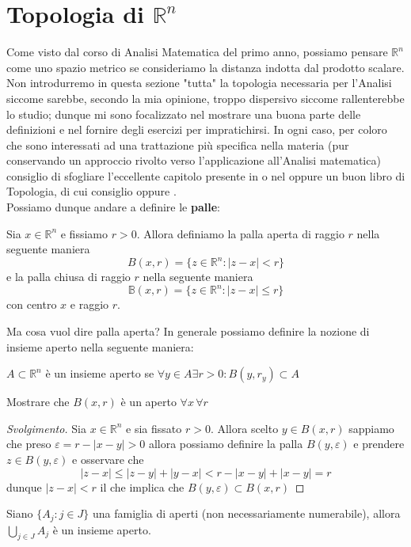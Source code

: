 \section{Topologia di $\mathbb{R}^n$}
Come visto dal corso di Analisi Matematica del primo anno, possiamo pensare $\mathbb{R}^n$ come uno spazio metrico se consideriamo la distanza indotta dal prodotto scalare. Non introdurremo in questa sezione "tutta" la topologia necessaria per l'Analisi siccome sarebbe, secondo la mia opinione, troppo dispersivo siccome rallenterebbe lo studio; dunque mi sono focalizzato nel mostrare una buona parte delle definizioni e nel fornire degli esercizi per impratichirsi. In ogni caso, per coloro che sono interessati
ad una trattazione più specifica nella materia (pur conservando un approccio rivolto verso l'applicazione all'Analisi matematica) consiglio di sfogliare l'eccellente capitolo presente in \cite{rudin} o nel \cite{ambrosio} oppure un buon libro di Topologia, di cui consiglio \cite{manetti} oppure \cite{munkres}. \\
Possiamo dunque andare a definire le \textbf{palle}:
\begin{definition}
Sia $x \in \mathbb{R}^n$ e fissiamo $r > 0$. Allora definiamo la palla aperta di raggio $r$ nella seguente maniera
$$
B(x, r) = \{ z \in \mathbb{R}^n: |z-x| < r \}
$$
e la palla chiusa di raggio $r$ nella seguente maniera
$$
\mathbb{B}(x, r) = \{ z \in \mathbb{R}^n: |z - x| \leq r \}
$$
con centro $x$ e raggio $r$.
\end{definition}
\noindent Ma cosa vuol dire palla aperta? In generale possiamo definire la nozione di insieme aperto nella seguente maniera:
\begin{definition}
$A \subset \mathbb{R}^n$ è un insieme aperto se $\forall y \in A \exists r > 0: B(y, r_y) \subset A$
\end{definition}
\begin{exercise}
Mostrare che $B(x, r)$ è un aperto $\forall x \, \forall r$
\end{exercise}
\begin{proof}[Svolgimento]
Sia $x \in \mathbb{R}^n$ e sia fissato $r > 0$. Allora scelto $y \in B(x, r)$ sappiamo che preso $\varepsilon = r - |x - y| > 0$ allora 
possiamo definire la palla $B(y, \varepsilon)$ e prendere $z \in B(y, \varepsilon)$ e osservare che
$$
|z-x| \leq |z-y| + |y-x| < r - |x-y| + |x-y| = r
$$
dunque $|z-x| < r$ il che implica che $B(y, \varepsilon) \subset B(x, r)$
\end{proof}
\begin{exercise}
Siano $\{A_j: j \in J \}$ una famiglia di aperti (non necessariamente numerabile), allora $\bigcup\limits_{j \in J} A_j$ è un insieme aperto.
\end{exercise}
